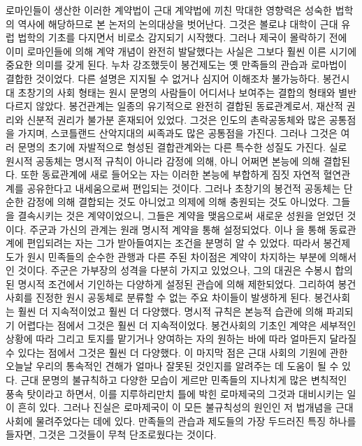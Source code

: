 로마인들이 생산한 이러한 계약법이
근대 계약법에 끼친 막대한 영향력은
성숙한 법학의 역사에 해당하므로
본 논저의 논의대상을 벗어난다.
그것은
볼로냐 대학이 근대 유럽 법학의 기초를 다지면서
비로소
감지되기 시작했다.
그러나
제국이 몰락하기 전에 이미
로마인들에 의해
계약 개념이
완전히 발달했다는 사실은
그보다 훨씬 이른 시기에
중요한 의미를 갖게 된다.
누차 강조했듯이
봉건제도는 옛 만족들의 관습과 로마법이
결합한 것이었다.
다른 설명은 지지될 수 없거나 심지어 이해조차 불가능하다.
봉건시대 초창기의 사회 형태는
원시 문명의 사람들이 어디서나 보여주는
결합의 형태와 별반 다르지 않았다.
봉건관계는 일종의 유기적으로 완전히 결합된 동료관계로서,
재산적 권리와 신분적 권리가 불가분 혼재되어 있었다.
그것은 인도의 촌락공동체와 많은 공통점을 가지며,
스코틀랜드 산악지대의 씨족과도 많은 공통점을 가진다.
그러나 그것은 여러 문명의 초기에 자발적으로 형성된 결합관계와는 다른
특수한 성질도 가진다.
실로 원시적 공동체는 명시적 규칙이 아니라 감정에 의해,
아니 어쩌면 본능에 의해 결합된다.
또한 동료관계에 새로 들어오는 자는
이러한 본능에 부합하게
짐짓
자연적 혈연관계를 공유한다고 내세움으로써 편입되는 것이다.
그러나 초창기의 봉건적 공동체는 단순한 감정에 의해
결합되는 것도 아니었고
의제에 의해 충원되는 것도 아니었다.
그들을 결속시키는 것은 계약이었으니,
그들은 계약을 맺음으로써 새로운 성원을 얻었던 것이다.
주군과 가신의 관계는 원래 명시적 계약을 통해 설정되었다.
이나
을 통해
동료관계에 편입되려는 자는
그가 받아들여지는 조건을 분명히 알 수 있었다.
따라서 봉건제도가 원시 민족들의 순수한 관행과 다른
주된 차이점은 계약이 차지하는 부분에 의해서인 것이다.
주군은 가부장의 성격을 다분히 가지고 있었으나,
그의 대권은
수봉시 합의된 명시적 조건에서 기인하는 다양하게 설정된 관습에 의해
제한되었다.
그리하여 봉건사회를 진정한 원시 공동체로 분류할 수 없는
주요 차이들이 발생하게 된다.
봉건사회는 훨씬 더 지속적이었고 훨씬 더 다양했다.
명시적 규칙은 본능적 습관에 의해 파괴되기 어렵다는 점에서
그것은
훨씬 더 지속적이었다.
봉건사회의 기초인 계약은
세부적인 상황에 따라
그리고
토지를 맡기거나 양여하는 자의 원하는 바에 따라
얼마든지 달라질 수 있다는 점에서
그것은
훨씬 더 다양했다.
이 마지막 점은
근대 사회의 기원에 관한 오늘날 우리의 통속적인 견해가
얼마나 잘못된 것인지를 알려주는 데 도움이 될 수 있다.
근대 문명의 불규칙하고 다양한 모습이
게르만 민족들의 지나치게 많은 변칙적인 풍속 탓이라고 하면서,
이를 지루하리만치 틀에 박힌 로마제국의 그것과 대비시키는 일이 흔히 있다.
그러나 진실은
로마제국이 이 모든 불규칙성의 원인인 저 법개념을
근대 사회에 물려주었다는 데에 있다.
만족들의 관습과 제도들의 가장 두드러진 특징 하나를 들자면,
그것은
그것들이 무척 단조로웠다는 것이다.


